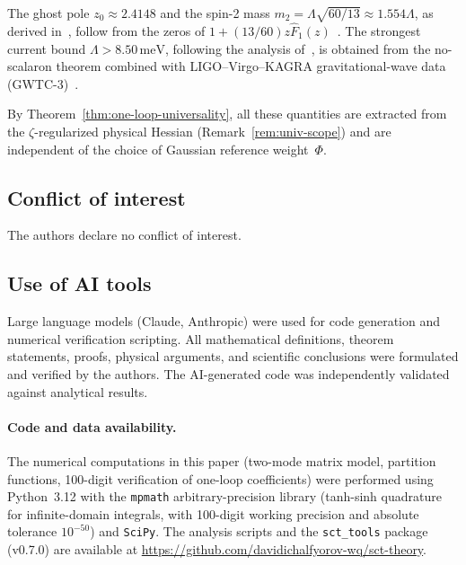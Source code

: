 \documentclass[12pt,a4paper]{article}
\theoremstyle{plain}
\theoremstyle{definition}
\theoremstyle{remark}
\newcommand{\Lam}{\Lambda}
\begin{document}
The ghost pole $z_0 \approx 2.4148$ and the spin-2 mass
$m_2 = \Lam\sqrt{60/13} \approx 1.554\Lam$, as derived
in~\cite{Alfyorov:2026ff}, follow from the zeros of
$1 + (13/60)z\hat F_1(z)$~\cite{CZ:2013,Alfyorov:2026ff}.
The strongest current bound $\Lam > 8.50\,\mathrm{meV}$, following
the analysis of~\cite{Alfyorov:2026ss}, is obtained
from the no-scalaron theorem combined with LIGO--Virgo--KAGRA
gravitational-wave data (GWTC-3)~\cite{Alfyorov:2026ss}.

By Theorem~\ref{thm:one-loop-universality}, all these quantities are
extracted from the $\zeta$-regularized physical Hessian
(Remark~\ref{rem:univ-scope}) and are independent of the choice of
Gaussian reference weight~$\Phi$.


\subsection*{Conflict of interest}
The authors declare no conflict of interest.

\subsection*{Use of AI tools}
Large language models (Claude, Anthropic) were used for code generation
and numerical verification scripting.
All mathematical definitions, theorem statements, proofs, physical
arguments, and scientific conclusions were formulated and verified by the
authors.  The AI-generated code was independently validated against
analytical results.

\paragraph{Code and data availability.}
The numerical computations in this paper (two-mode matrix model,
partition functions, 100-digit verification of one-loop coefficients)
were performed using Python~3.12 with the \texttt{mpmath}
arbitrary-precision library (tanh-sinh quadrature for infinite-domain
integrals, with 100-digit working precision and absolute tolerance
$10^{-50}$) and \texttt{SciPy}.  The analysis scripts and the
\texttt{sct\_tools} package (v0.7.0) are available at
\url{https://github.com/davidichalfyorov-wq/sct-theory}.



\end{document}
